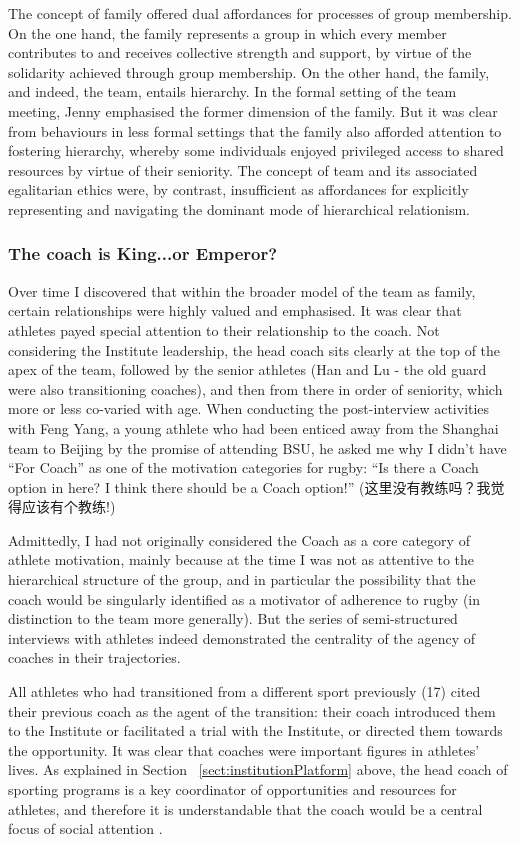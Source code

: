 \begin{CJK}{UTF8}{gbsn}
The concept of family offered dual affordances for processes of group membership.  On the one hand, the family represents a group in which every member contributes to and receives collective strength and support, by virtue of the solidarity achieved through group membership.  On the other hand, the family, and indeed, the team,  entails hierarchy.  In the formal setting of the team meeting, Jenny emphasised the former dimension of the family.  But it was clear from behaviours in less formal settings that the family also afforded attention to fostering hierarchy, whereby some individuals enjoyed privileged access to shared resources by virtue of their seniority.  The concept of team and its associated egalitarian ethics were, by contrast, insufficient as affordances for explicitly representing and navigating the dominant mode of hierarchical relationism.

\subsubsection{The coach is King...or Emperor?}
Over time I discovered that within the broader model of the team as family, certain relationships were highly valued and emphasised. It was clear that athletes payed special attention to their relationship to the coach.  Not considering the Institute leadership, the head coach sits clearly at the top of the apex of the team, followed by the senior athletes (Han and Lu - the old guard were also transitioning coaches), and then from there in order of seniority, which more or less co-varied with age.  When conducting the post-interview activities with Feng Yang, a young athlete who had been enticed away from the Shanghai team to Beijing by the promise of attending BSU, he asked me why I didn't have ``For Coach'' as one of the motivation categories for rugby:  ``Is there a Coach option in here?  I think there should be a Coach option!'' (这里没有教练吗？我觉得应该有个教练!)

Admittedly, I had not originally considered the Coach as a core category of athlete motivation, mainly because at the time I was not as attentive to the hierarchical structure of the group, and in particular the possibility that the coach would be singularly identified as a motivator of adherence to rugby (in distinction to the team more generally).  But the series of semi-structured interviews with athletes indeed demonstrated the centrality of the agency of coaches in their trajectories.

All athletes who had transitioned from a different sport previously (17) cited their previous coach as the agent of the transition: their coach introduced them to the Institute or facilitated a trial with the Institute, or directed them towards the opportunity.  It was clear that coaches were important figures in athletes' lives.  As explained in Section ~\ref{sect:institutionPlatform} above, the head coach of sporting programs is a key coordinator of opportunities and resources for athletes, and therefore it is understandable that the coach would be a central focus of social attention \citep{Yuki2005}.


\end{CJK}
